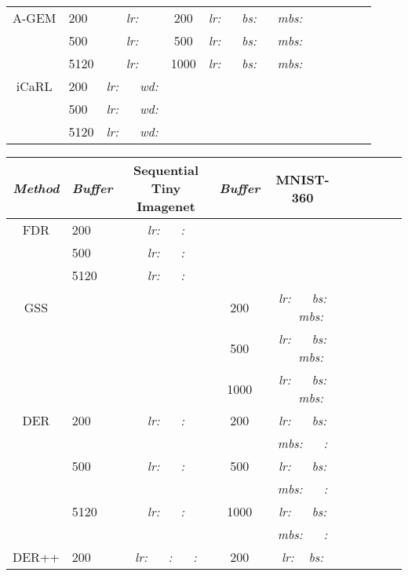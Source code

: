 \documentclass{article}
\begin{document}
\begin{table}[H]
\begin{tabular}{| Sl | Sc | Sl | Sc | Sl |}
A-GEM  & 200    & \textit{lr:}   &
200    & \textit{lr:}  ~~ \textit{bs:}  ~~ \textit{mbs:}  \\
        & 500    & \textit{lr:}   &
500    & \textit{lr:}  ~~ \textit{bs:}  ~~ \textit{mbs:}  \\
        & 5120   & \textit{lr:}   &
1000    & \textit{lr:}  ~~ \textit{bs:}  ~~ \textit{mbs:} \\
iCaRL   & 200    & \textit{lr:}  ~~ \textit{wd:}  & & \\
        & 500    & \textit{lr:}  ~~ \textit{wd:}  & & \\
        & 5120   & \textit{lr:}  ~~ \textit{wd:}  & & \\
\hline
\end{tabular}
\end{table}

\begin{table}[H]
\centering\begin{tabular}{| Sl | Sc | Sl | Sc | Sl |}
\hline
\textit{Method} & \textit{Buffer} & \textbf{Sequential Tiny Imagenet} & \textit{Buffer} & \textbf{MNIST-360} \\
\hline
FDR      & 200   & \textit{lr:}  ~~ \textit{:}  & & \\
        & 500    & \textit{lr:}   ~~ \textit{:}  & &\\
        & 5120   & \textit{lr:}   ~~ \textit{:}  & & \\
GSS      & & & 200    & \textit{lr:}  ~~ \textit{bs:}  ~~ \textit{mbs:}  \\
        & & & 500    & \textit{lr:}  ~~ \textit{bs:}  ~~ \textit{mbs:}  \\
        & & & 1000   & \textit{lr:}  ~~ \textit{bs:}  ~~ \textit{mbs:}  \\
DER      & 200   & \textit{lr:}  ~~ \textit{:}  & 200  & \textit{lr:}  ~~ \textit{bs:}  \\
        & & & & \textit{mbs:}  ~~ \textit{:} \\
        & 500    & \textit{lr:}   ~~ \textit{:}  & 500  & \textit{lr:}  ~~ \textit{bs:}  \\
        & & & & \textit{mbs:}  ~~ \textit{:} \\
        & 5120   & \textit{lr:}   ~~ \textit{:}  & 1000 & \textit{lr:}  ~~ \textit{bs:}  \\
        & & & & \textit{mbs:}  ~~ \textit{:} \\
DER++   & 200    & \textit{lr:}   ~~ \textit{:}  ~~ \textit{:}  & 200    & \textit{lr:}  ~ \textit{bs:}  \\

\end{tabular}
\end{table}
\end{document}
